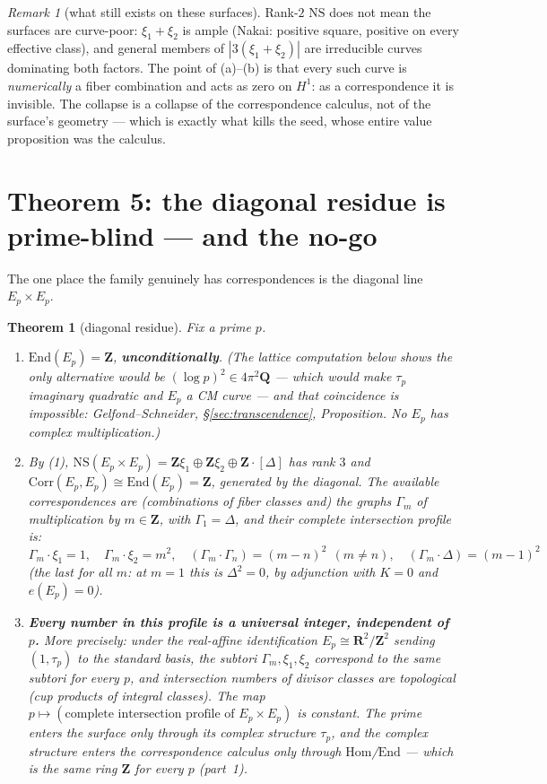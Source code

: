 \documentclass[11pt]{article}
\newtheorem{theorem}{Theorem}
\theoremstyle{definition}
\theoremstyle{remark}
\newtheorem{remark}{Remark}
\newcommand{\Z}{\mathbf{Z}}
\newcommand{\Q}{\mathbf{Q}}
\newcommand{\R}{\mathbf{R}}
\newcommand{\NS}{\mathrm{NS}}
\newcommand{\Hom}{\mathrm{Hom}}
\newcommand{\End}{\mathrm{End}}
\newcommand{\Corr}{\mathrm{Corr}}
\begin{document}
\begin{remark}[what still exists on these surfaces]
\label{rem:stillexists}
Rank-$2$ $\NS$ does not mean the surfaces are curve-poor: $\xi_1 + \xi_2$ is
ample (Nakai: positive square, positive on every effective class), and
general members of $|3(\xi_1+\xi_2)|$ are irreducible curves dominating both
factors. The point of (a)--(b) is that every such curve is \emph{numerically}
a fiber combination and acts as zero on $H^1$: as a correspondence it is
invisible. The collapse is a collapse of the correspondence calculus, not of
the surface's geometry --- which is exactly what kills the seed, whose
entire value proposition was the calculus.
\end{remark}

\section{Theorem 5: the diagonal residue is prime-blind --- and the no-go}
\label{sec:diagonal}

The one place the family genuinely has correspondences is the diagonal line
$E_p \times E_p$.

\begin{theorem}[diagonal residue]
\label{thm:diagonal}
Fix a prime $p$.
\begin{enumerate}
\item $\End(E_p) = \Z$, \textbf{unconditionally}. (The lattice computation
below shows the only alternative would be $(\log p)^2 \in 4\pi^2\Q$ ---
which would make $\tau_p$ imaginary quadratic and $E_p$ a CM curve --- and
that coincidence is impossible: Gelfond--Schneider,
\S\ref{sec:transcendence}, Proposition. No $E_p$ has complex
multiplication.)
\item By (1), $\NS(E_p \times E_p) = \Z\xi_1 \oplus \Z\xi_2 \oplus \Z\cdot[\Delta]$
has rank $3$ and $\Corr(E_p, E_p) \cong \End(E_p) = \Z$, generated by the
diagonal. The available correspondences are (combinations of fiber classes
and) the graphs $\Gamma_m$ of multiplication by $m \in \Z$, with
$\Gamma_1 = \Delta$, and their complete intersection profile is:
\[
\Gamma_m\cdot\xi_1 = 1 , \quad
\Gamma_m\cdot\xi_2 = m^2 , \quad
(\Gamma_m\cdot\Gamma_n) = (m-n)^2 \ \ (m \neq n) , \quad
(\Gamma_m\cdot\Delta) = (m-1)^2
\]
(the last for all $m$: at $m = 1$ this is $\Delta^2 = 0$, by adjunction with
$K = 0$ and $e(E_p) = 0$).
\item \textbf{Every number in this profile is a universal integer,
independent of $p$.} More precisely: under the real-affine identification
$E_p \cong \R^2/\Z^2$ sending $(1, \tau_p)$ to the standard basis, the
subtori $\Gamma_m, \xi_1, \xi_2$ correspond to the \emph{same} subtori for
every $p$, and intersection numbers of divisor classes are topological (cup
products of integral classes). The map
$p \mapsto (\text{complete intersection profile of } E_p \times E_p)$ is
constant. The prime enters the surface only through its complex structure
$\tau_p$, and the complex structure enters the correspondence calculus only
through $\Hom$/$\End$ --- which is the same ring $\Z$ for every $p$
(part~1).
\end{enumerate}
\end{theorem}
\end{document}
